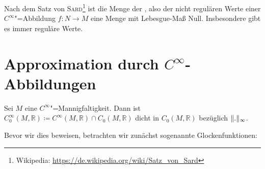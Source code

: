 \begin{bemerkung}[{name=[Satz von Sard]}]
	Nach dem Satz von \textsc{Sard}\footnote{Wikipedia: \url{https://de.wikipedia.org/wiki/Satz_von_Sard}} ist die Menge der , also der nicht regulären Werte einer $C^\infty$"=Abbildung $f \colon N \to M$ eine Menge mit Lebesgue-Maß Null. 
	Insbesondere gibt es immer reguläre Werte.
\end{bemerkung}

\newpage
\section{Approximation durch $C^\infty$-Abbildungen} %
\label{sec:approximation_durch_c_infty_abbildungen}

\begin{proposition}[{name=[glatte Funktionen dicht in den im Unendlichen verschwindenden]},label=prop:glatt-dicht]
	Sei $M$ eine $C^\infty$"=Mannigfaltigkeit. 
	Dann ist $C^\infty_0 (M,\mathbb{R}) \coloneqq C^\infty(M,\mathbb{R}) \cap C_0(M,\mathbb{R})$ dicht in $C_0(M,\mathbb{R})$ bezüglich $\Vert.\Vert_\infty$.
\end{proposition}

Bevor wir dies beweisen, betrachten wir zunächst sogenannte Glockenfunktionen:

